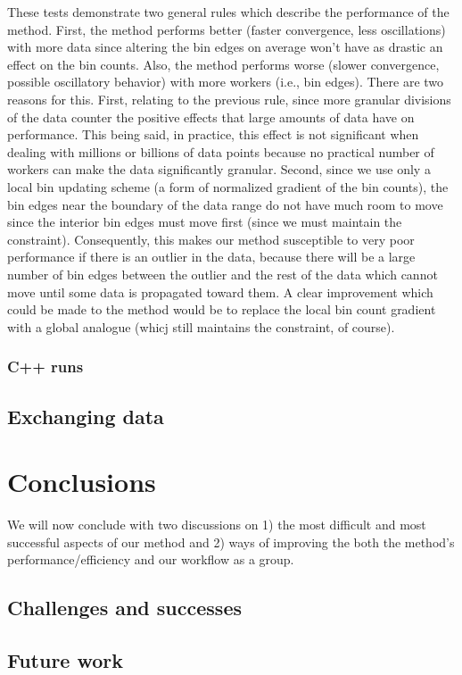 \documentclass{article}
\begin{document}
These tests demonstrate two general rules which describe the performance of the method. First, the method performs better (faster convergence, less oscillations) with more data since altering the bin edges on average won't have as drastic an effect on the bin counts. Also, the method performs worse (slower convergence, possible oscillatory behavior) with more workers (i.e., bin edges). There are two reasons for this. First, relating to the previous rule, since more granular divisions of the data counter the positive effects that large amounts of data have on performance. This being said, in practice, this effect is not significant when dealing with millions or billions of data points because no practical number of workers can make the data significantly granular. Second, since we use only a local bin updating scheme (a form of normalized gradient of the bin counts), the bin edges near the boundary of the data range do not have much room to move since the interior bin edges must move first (since we must maintain the constraint). Consequently, this makes our method susceptible to very poor performance if there is an outlier in the data, because there will be a large number of bin edges between the outlier and the rest of the data which cannot move until some data is propagated toward them. A clear improvement which could be made to the method would be to replace the local bin count gradient with a global analogue (whicj still maintains the constraint, of course).


\subsubsection{C++ runs}





\subsection{Exchanging data}



\section{Conclusions}
We will now conclude with two discussions on 1) the most difficult and most successful aspects of our method and 2) ways of improving the both the method's performance/efficiency and our workflow as a group.

\subsection{Challenges and successes}


\subsection{Future work}



\end{document}
